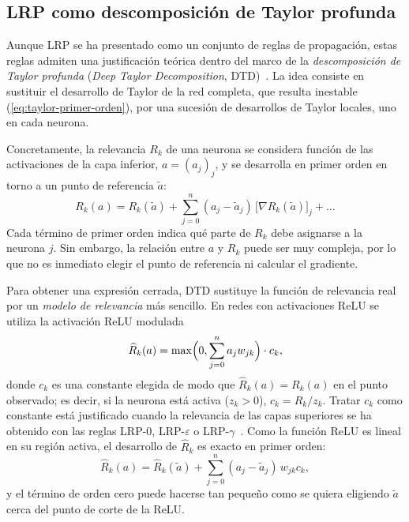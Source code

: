 \subsection{LRP como descomposición de Taylor profunda}\label{sec:lrp-dtd}

Aunque LRP se ha presentado como un conjunto de reglas de propagación, estas
reglas admiten una justificación teórica dentro del marco de la
\emph{descomposición de Taylor profunda} (\emph{Deep Taylor Decomposition},
DTD)~\cite{montavon2017,montavon2019lrp}. La idea consiste en sustituir el
desarrollo de Taylor de la red completa, que resulta inestable
(\cref{eq:taylor-primer-orden}), por una sucesión de desarrollos de Taylor
locales, uno en cada neurona.

Concretamente, la relevancia $R_k$ de una neurona se considera función de las
activaciones de la capa inferior, $a = (a_j)_j$, y se desarrolla en primer orden
en torno a un punto de referencia $\tilde{a}$:
\begin{equation}\label{eq:dtd-taylor}
  R_k(a) = R_k(\tilde{a}) + \sum_{j=0}^{n} (a_j - \tilde{a}_j) \,
           \bigl[\nabla R_k(\tilde{a})\bigr]_j + \dots
\end{equation}
Cada término de primer orden indica qué parte de $R_k$ debe asignarse a la
neurona $j$. Sin embargo, la relación entre $a$ y $R_k$ puede ser muy compleja,
por lo que no es inmediato elegir el punto de referencia ni calcular el
gradiente.

Para obtener una expresión cerrada, DTD sustituye la función de relevancia real
por un \emph{modelo de relevancia} más sencillo. En redes con activaciones ReLU
se utiliza la activación ReLU modulada
\begin{equation}\label{eq:dtd-modelo}
  \widehat{R}_k(a) = \max\Bigl(0, \sum_{j=0}^{n} a_j w_{jk}\Bigr) \cdot c_k ,
\end{equation}
donde $c_k$ es una constante elegida de modo que $\widehat{R}_k(a) = R_k(a)$ en
el punto observado; es decir, si la neurona está activa ($z_k > 0$),
$c_k = R_k / z_k$. Tratar $c_k$ como constante está justificado cuando la
relevancia de las capas superiores se ha obtenido con las reglas LRP-0,
LRP-$\varepsilon$ o LRP-$\gamma$~\cite{montavon2019lrp}. Como la función ReLU es
lineal en su región activa, el desarrollo de $\widehat{R}_k$ es exacto en primer
orden:
\[
  \widehat{R}_k(a) = \widehat{R}_k(\tilde{a})
    + \sum_{j=0}^{n} (a_j - \tilde{a}_j) \, w_{jk} c_k ,
\]
y el término de orden cero puede hacerse tan pequeño como se quiera eligiendo
$\tilde{a}$ cerca del punto de corte de la ReLU. 

